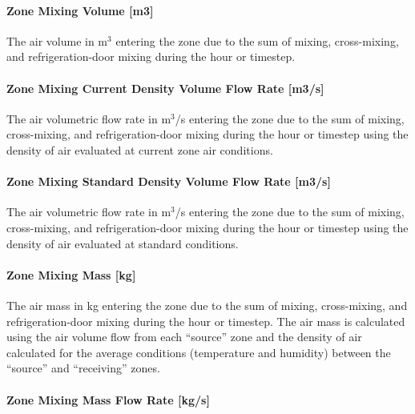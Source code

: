 \paragraph{Zone Mixing Volume {[}m3{]}}\label{zone-mixing-volume-m3-1}

The air volume in m\(^{3}\) entering the zone due to the sum of mixing, cross-mixing, and refrigeration-door mixing during the hour or timestep.

\paragraph{Zone Mixing Current Density Volume Flow Rate {[}m3/s{]}}\label{zone-mixing-current-density-volumetric-flow-rate-m3s-1}

The air volumetric flow rate in m\(^{3}\)/s entering the zone due to the sum of mixing, cross-mixing, and refrigeration-door mixing during the hour or timestep using the density of air evaluated at current zone air conditions.

\paragraph{Zone Mixing Standard Density Volume Flow Rate {[}m3/s{]}}\label{zone-mixing-standard-density-volumetric-flow-rate-m3s-1}

The air volumetric flow rate in m\(^{3}\)/s entering the zone due to the sum of mixing, cross-mixing, and refrigeration-door mixing during the hour or timestep using the density of air evaluated at standard conditions.

\paragraph{Zone Mixing Mass {[}kg{]}}\label{zone-mixing-mass-kg-1}

The air mass in kg entering the zone due to the sum of mixing, cross-mixing, and refrigeration-door mixing during the hour or timestep. The air mass is calculated using the air volume flow from each ``source'' zone and the density of air calculated for the average conditions (temperature and humidity) between the ``source'' and ``receiving'' zones.

\paragraph{Zone Mixing Mass Flow Rate {[}kg/s{]}}\label{zone-mixing-mass-flow-rate-kgs-1}

